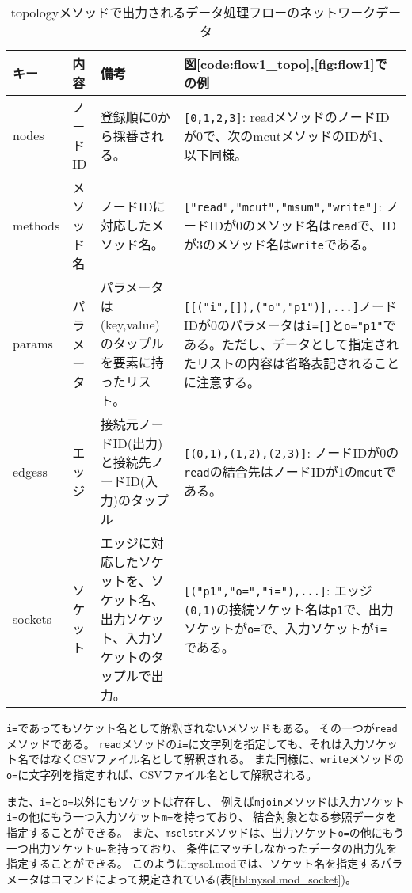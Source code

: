 \begin{table}[hbt]
\begin{center}
 \caption{topologyメソッドで出力されるデータ処理フローのネットワークデータ\label{tbl:flow_dic}}
{\footnotesize
	\begin{tabular}{l|l|p{4cm}|p{8cm}}
\hline
キー & 内容 & 備考 & 図\ref{code:flow1_topo},\ref{fig:flow1}での例 \\
\hline
nodes   & ノードID   & 登録順に0から採番される。& \verb|[0,1,2,3]|: readメソッドのノードIDが0で、次のmcutメソッドのIDが1、以下同様。 \\
methods & メソッド名 & ノードIDに対応したメソッド名。& \verb|["read","mcut","msum","write"]|: ノードIDが0のメソッド名は\verb|read|で、IDが3のメソッド名は\verb|write|である。\\
params  & パラメータ & パラメータは(key,value)のタップルを要素に持ったリスト。& \verb|[[("i",[]),("o","p1")],...]|ノードIDが0のパラメータは\verb|i=[]|と\verb|o="p1"|である。ただし、データとして指定されたリストの内容は省略表記されることに注意する。\\
edgess  & エッジ     & 接続元ノードID(出力)と接続先ノードID(入力)のタップル & \verb|[(0,1),(1,2),(2,3)]|: ノードIDが0の\verb|read|の結合先はノードIDが1の\verb|mcut|である。\\
sockets & ソケット   & エッジに対応したソケットを、ソケット名、出力ソケット、入力ソケットのタップルで出力。 & \verb|[("p1","o=","i="),...]|: エッジ\verb|(0,1)|の接続ソケット名は\verb|p1|で、出力ソケットが\verb|o=|で、入力ソケットが\verb|i=|である。\\
\hline
 \end{tabular}
}
\end{center}
\end{table}

\verb|i=|であってもソケット名として解釈されないメソッドもある。
その一つが\verb|read|メソッドである。
\verb|read|メソッドの\verb|i=|に文字列を指定しても、それは入力ソケット名ではなくCSVファイル名として解釈される。
また同様に、\verb|write|メソッドの\verb|o=|に文字列を指定すれば、CSVファイル名として解釈される。

また、\verb|i=|と\verb|o=|以外にもソケットは存在し、
例えば\verb|mjoin|メソッドは入力ソケット\verb|i=|の他にもう一つ入力ソケット\verb|m=|を持っており、
結合対象となる参照データを指定することができる。
また、\verb|mselstr|メソッドは、出力ソケット\verb|o=|の他にもう一つ出力ソケット\verb|u=|を持っており、
条件にマッチしなかったデータの出力先を指定することができる。
このようにnysol.modでは、ソケット名を指定するパラメータはコマンドによって規定されている(表\ref{tbl:nysol.mod_socket})。

